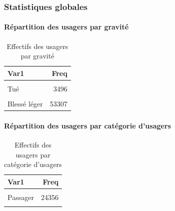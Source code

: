 \documentclass[french,]{tp}
\let\oldparagraph\paragraph
\renewcommand{\paragraph}[1]{\oldparagraph{#1}\mbox{}}
\begin{document}
\hypertarget{statistiques-globales}{%
\subsubsection{Statistiques globales}\label{statistiques-globales}}

\hypertarget{ruxe9partition-des-usagers-par-gravituxe9}{%
\paragraph{Répartition des usagers par gravité}\label{ruxe9partition-des-usagers-par-gravituxe9}}



\begin{table}[H]

\caption{\label{tab:tablegrav}Effectifs des usagers par gravité}
\centering
\begin{tabular}[t]{lr}
\toprule
\textbf{Var1} & \textbf{Freq}\\
\midrule
\cellcolor{gray!6}{Indemne} & \cellcolor{gray!6}{55314}\\
Tué & 3496\\
\cellcolor{gray!6}{Blessé hospitalisé} & \cellcolor{gray!6}{20858}\\
Blessé léger & 53307\\
\bottomrule
\end{tabular}
\end{table}

\hypertarget{ruxe9partition-des-usagers-par-catuxe9gorie-dusagers}{%
\paragraph{Répartition des usagers par catégorie d'usagers}\label{ruxe9partition-des-usagers-par-catuxe9gorie-dusagers}}



\begin{table}[H]

\caption{\label{tab:tablecatu}Effectifs des usagers par catégorie d'usagers}
\centering
\begin{tabular}[t]{lr}
\toprule
\textbf{Var1} & \textbf{Freq}\\
\midrule
\cellcolor{gray!6}{Conducteur} & \cellcolor{gray!6}{97355}\\
Passager & 24356\\
\cellcolor{gray!6}{Piéton} & \cellcolor{gray!6}{11264}\\
\bottomrule
\end{tabular}
\end{table}
\end{document}
